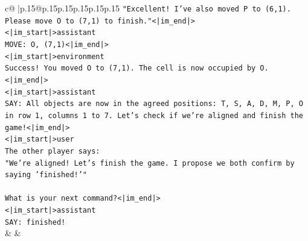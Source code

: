 \documentclass{article}
\begin{document}
{\begin{supertabular}{c@{$\;$}|p{.15\linewidth}@{}p{.15\linewidth}p{.15\linewidth}p{.15\linewidth}p{.15\linewidth}p{.15\linewidth}}
{{{\texttt{"Excellent! I've also moved P to (6,1). Please move O to (7,1) to finish."<|im\_end|>} \\
\texttt{<|im\_start|>assistant} \\
\texttt{MOVE: O, (7,1)<|im\_end|>} \\
\texttt{<|im\_start|>environment} \\
\texttt{Success! You moved O to (7,1). The cell is now occupied by O.<|im\_end|>} \\
\texttt{<|im\_start|>assistant} \\
\texttt{SAY: All objects are now in the agreed positions: T, S, A, D, M, P, O in row 1, columns 1 to 7. Let's check if we're aligned and finish the game!<|im\_end|>} \\
\texttt{<|im\_start|>user} \\
\texttt{The other player says:} \\
\texttt{"We're aligned! Let's finish the game. I propose we both confirm by saying 'finished!'"} \\
\\ 
\texttt{What is your next command?<|im\_end|>} \\
\texttt{<|im\_start|>assistant} \\
\texttt{SAY: finished!} \\
            }
        }
    }
    & & \\ \\


\end{supertabular}}
\end{document}
